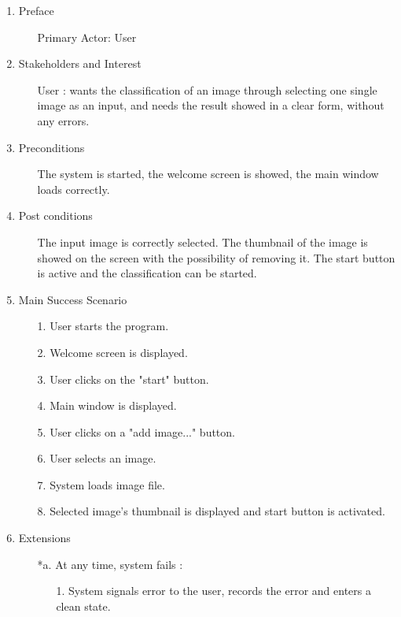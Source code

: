 \documentclass[parskip=full]{scrartcl}
\begin{document}
\begin{enumerate}
	\item Preface
	\begin{itemize} [nosep]
		\item[] Primary Actor: User
	\end{itemize}
	\item Stakeholders and Interest
	\begin{itemize} [nosep]
		\item[] User : wants the classification of an image through selecting one single image as an input, and needs the result showed in a clear form, without any errors.
	\end{itemize}
	\item Preconditions
	\begin{itemize} [nosep]
		\item[] The system is started, the welcome screen is showed, the main window loads correctly.
	\end{itemize}
	\item Post conditions
	\begin{itemize} [nosep]
		\item[] The input image is correctly selected. The thumbnail of the image is showed on the screen with the possibility of removing it. The start button is active and the classification can be started.
	\end{itemize}
	\item Main Success Scenario
	\begin{itemize} [nosep]
		\item[1.] User starts the program.
		\item[2.] Welcome screen is displayed.
		\item[3.] User clicks on the "start" button.
		\item[4.] Main window is displayed.
		\item[5.] User clicks on a "add image..." button.
		\item[6.] User selects an image.
		\item[7.] System loads image file.
		\item[8.] Selected image's thumbnail is displayed and start button is activated.
	\end{itemize}
	\item Extensions
	\begin{itemize} [nosep]
		\item[*a.] At any time, system fails :
		\begin{itemize} [nosep]
			\item[1.] System signals error to the user, records the error and enters a clean state.

\end{itemize}
\end{itemize}
\end{enumerate}
\end{document}

